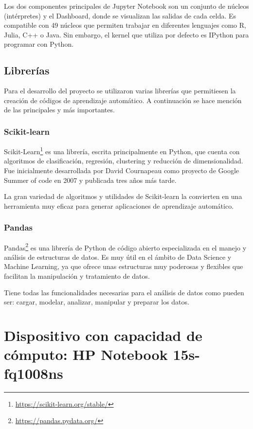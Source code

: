 \documentclass[a4paper, 12pt]{book}
\begin{document}
Los dos componentes principales de Jupyter Notebook son un conjunto de núcleos (intérpretes) y el Dashboard, donde se visualizan las salidas de cada celda. Es compatible con 49 núcleos que permiten trabajar en diferentes lenguajes como R, Julia, C++ o Java. Sin embargo, el kernel que utiliza por defecto es IPython para programar con Python. 

\subsection{Librerías}
\label{subsec:Librerías}
Para el desarrollo del proyecto se utilizaron varias librerías que permitiesen la creación de códigos de aprendizaje automático. A continuación se hace mención de las principales y más importantes.

\subsubsection{Scikit-learn}
\label{subsubsec:Scikit-learn}
Scikit-Learn\footnote{\url{https://scikit-learn.org/stable/}} es una librería, escrita principalmente en Python, que cuenta con algoritmos de clasificación, regresión, clustering y reducción de dimensionalidad. Fue inicialmente desarrollada por David Cournapeau como proyecto de Google Summer of code en 2007 y publicada tres años más tarde.

La gran variedad de algoritmos y utilidades de Scikit-learn la convierten en una herramienta muy eficaz para generar aplicaciones de aprendizaje automático.

\subsubsection{Pandas}
\label{subsubsec:Pandas}

Pandas\footnote{\url{https://pandas.pydata.org/}} es una librería de Python de código abierto especializada en el manejo y análisis de estructuras de datos. Es muy útil en el ámbito de Data Science y Machine Learning, ya que ofrece unas estructuras muy poderosas y flexibles que facilitan la manipulación y tratamiento de datos.

Tiene todas las funcionalidades necesarias para el análisis de datos como pueden ser: cargar, modelar, analizar, manipular y preparar los datos.


\section{Dispositivo con capacidad de cómputo: HP Notebook 15s-fq1008ns}
\label{sec:portatil}
\end{document}
